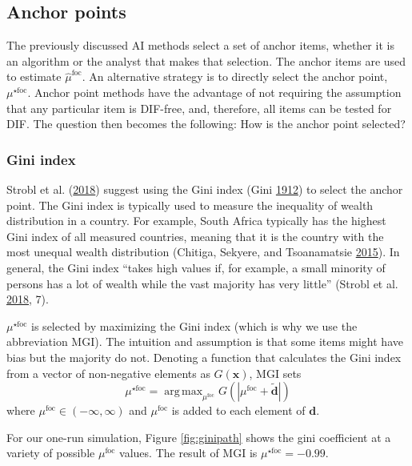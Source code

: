 \documentclass[
  11pt,
]{article}
\begin{document}
\hypertarget{anchor-points}{%
\subsection{Anchor points}\label{anchor-points}}

The previously discussed AI methods select a set of anchor items, whether it is an algorithm or the analyst that makes that selection. The anchor items are used to estimate \(\hat \mu^\text{foc}\). An alternative strategy is to directly select the anchor point, \(\mu^{\star\text{foc}}\). Anchor point methods have the advantage of not requiring the assumption that any particular item is DIF-free, and, therefore, all items can be tested for DIF. The question then becomes the following: How is the anchor point selected?

\hypertarget{gini-index}{%
\subsubsection{Gini index}\label{gini-index}}

Strobl et al. (\protect\hyperlink{ref-strobl2018anchor}{2018}) suggest using the Gini index (Gini \protect\hyperlink{ref-gini1912variabilita}{1912}) to select the anchor point. The Gini index is typically used to measure the inequality of wealth distribution in a country. For example, South Africa typically has the highest Gini index of all measured countries, meaning that it is the country with the most unequal wealth distribution (Chitiga, Sekyere, and Tsoanamatsie \protect\hyperlink{ref-chitiga2015income}{2015}). In general, the Gini index \enquote{takes high values if, for example, a small minority of persons has a lot of wealth while the vast majority has very little} (Strobl et al. \protect\hyperlink{ref-strobl2018anchor}{2018}, 7).

\(\mu^{\star\text{foc}}\) is selected by maximizing the Gini index (which is why we use the abbreviation MGI). The intuition and assumption is that some items might have bias but the majority do not. Denoting a function that calculates the Gini index from a vector of non-negative elements as \(G(\mathbf{x})\), MGI sets
\[
\mu^{\star\text{foc}} = \mathop\mathrm{arg\,max}_{\mu^\text{foc}} G(|\mu^\text{foc} + \tilde{\mathbf{d}}|)
\]
where \(\mu^\text{foc} \in (-\infty, \infty)\) and \(\mu^\text{foc}\) is added to each element of \(\mathbf{d}\).

For our one-run simulation, Figure \ref{fig:ginipath} shows the gini coefficient at a variety of possible \(\mu^\text{foc}\) values. The result of MGI is \(\mu^{\star\text{foc}} = -0.99\).
\end{document}

